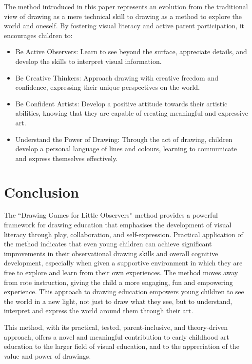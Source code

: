 \documentclass{article}
\begin{document}
The method introduced in this paper represents an evolution from the traditional view of drawing as a mere technical skill to drawing as a method to explore the world and oneself. By fostering visual literacy and active parent participation, it encourages children to:

\begin{itemize}
    \item Be Active Observers: Learn to see beyond the surface, appreciate details, and develop the skills to interpret visual information.
    \item Be Creative Thinkers: Approach drawing with creative freedom and confidence, expressing their unique perspectives on the world.
    \item Be Confident Artists: Develop a positive attitude towards their artistic abilities, knowing that they are capable of creating meaningful and expressive art.
    \item Understand the Power of Drawing: Through the act of drawing, children develop a personal language of lines and colours, learning to communicate and express themselves effectively.
\end{itemize}


\section{Conclusion}

The “Drawing Games for Little Observers” method provides a powerful framework for drawing education that emphasises the development of visual literacy through play, collaboration, and self-expression. Practical application of the method indicates that even young children can achieve significant improvements in their observational drawing skills and overall cognitive development, especially when given a supportive environment in which they are free to explore and learn from their own experiences. The method moves away from rote instruction, giving the child a more engaging, fun and empowering experience.
This approach to drawing education empowers young children to see the world in a new light, not just to draw what they see, but to understand, interpret and express the world around them through their art.

This method, with its practical, tested, parent-inclusive, and theory-driven approach, offers a novel and meaningful contribution to early childhood art education to the larger field of visual education, and to the appreciation of the value and power of drawings.
\end{document}
